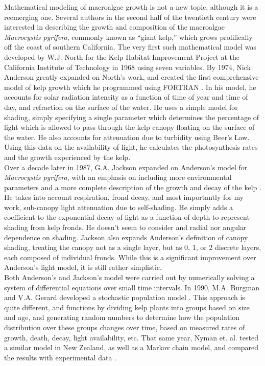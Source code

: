 Mathematical modeling of macroalgae growth is not a new topic, although it is a reemerging one.
Several authors in the second half of the twentieth century were interested in describing the growth and composition of the macroalgae \textit{Macrocystis pyrifera}, commonly known as ``giant kelp,'' which grows prolifically off the coast of southern California.
The very first such mathematical model was developed by W.J. North for the Kelp Habitat Improvement Project at the California Institute of Technology in 1968 using seven variables.
By 1974, Nick Anderson greatly expanded on North's work, and created the first comprehensive model of kelp growth which he programmed using FORTRAN \cite{anderson_mathematical_1974}.
In his model, he accounts for solar radiation intensity as a function of time of year and time of day, and refraction on the surface of the water.
He uses a simple model for shading, simply specifying a single parameter which determines the percentage of light which is allowed to pass through the kelp canopy floating on the surface of the water.
He also accounts for attenuation due to turbidity using Beer's Law.
Using this data on the availability of light, he calculates the photosynthesis rates and the growth experienced by the kelp. \\[-0.75em]

Over a decade later in 1987, G.A.
Jackson expanded on Anderson's model for \textit{Macrocystis pyrifera}, with an emphasis on including more environmental parameters and a more complete description of the growth and decay of the kelp \cite{jackson_modelling_1987}. 
He takes into account respiration, frond decay, and most importantly for my work, sub-canopy light attenuation due to self-shading.
He simply adds a coefficient to the exponential decay of light as a function of depth to represent shading from kelp fronds.
He doesn't seem to consider and radial nor angular dependence on shading.
Jackson also expands Anderson's definition of canopy shading, treating the canopy not as a single layer, but as 0, 1, or 2 discrete layers, each composed of individual fronds.
While this is a significant improvement over Anderson's light model, it is still rather simplistic. \\[-0.75em]

Both Anderson's and Jackson's model were carried out by numerically solving a system of differential equations over small time intervals.
In 1990, M.A. Burgman and V.A. Gerard developed a stochastic population model \cite{burgman_stage-structured_1990}.
This approach is quite different, and functions by dividing kelp plants into groups based on size and age, and generating random numbers to determine how the population distribution over these groups changes over time, based on measured rates of growth, death, decay, light availability, etc.
That same year, Nyman et. al. tested a similar model in New Zealand, as well as a Markov chain model, and compared the results with experimental data \cite{nyman_macrocystis_1990}. \\[-0.75em]


